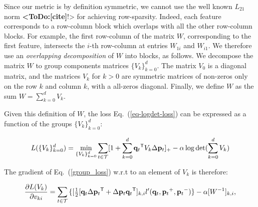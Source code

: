 \documentclass[twoside,11pt]{article}
\newcommand\todo[1]{\textbf{<ToDo:#1}!>}
\newcommand\mat[1]{{#1}}
\renewcommand\vec[1]{\mathbf{#1}}
\newcommand{\T}{{}^\mathsf{T}}
\newcommand{\W}{\mat{W}}
\newcommand{\q}{{\vec{q}}}
\newcommand{\p}{{\vec{p}}}
\newcommand{\trip}{{t}}
\newcommand{\qt}{{\q_{\trip}}}
\newcommand{\pt}{{\p_{\trip}}}
\newcommand{\triplet}{(\qt, \pt^{+}, \pt^{-})}
\newcommand{\Vk}{\mat{V_k}}
\newcommand{\Vz}{\mat{V_0}}
\newcommand{\Vg}{\{\Vk\}_{k=0}^{d}} %
\renewcommand{\eqref}[1]{Eq.~(\ref{#1})}
\begin{document}
Since our metric is by definition symmetric, we cannot use the well known $L_{21}$ norm \todo{[cite]} for achieving row-sparsity. Indeed, each feature corresponds to a row-column block which overlaps with all the other row-column blocks. For example, the first row-column of the matrix $\W$, corresponding to the first feature, intersects the $i$-th row-column at entries $W_{1i}$ and $W_{i1}$. We therefore use an \emph{overlapping decomposition} \citep{jacob2009group,obozinski2011group} of $W$ into blocks, as follows. 
We decompose the matrix $\W$ to group components matrices $\Vg$. The matrix $V_0$ is a diagonal matrix, and the matrices $V_k$ for $k>0$ are symmetric matrices of non-zeros only on the row $k$ and column $k$, with a all-zeros diagonal. Finally, we define $\W$ as the sum $\W = \sum_{k=0}^{d}{\Vk}$.





Given this definition of $\W$, the loss \eqref{eq-logdet-loss} can be expressed as a function of the groups $\Vg$:

\begin{equation}
L(\Vg) = 
  \min_{\Vg} \sum_{\trip \in \cal{T}}  [1+\sum_{k=0}^{d}{\qt\T \Vk\Delta \vec{p}_t } ]_{+} - \alpha \log \det(\sum_{k=0}^{d}{\Vk})
  \label{group_loss}
\end{equation} 

The gradient of \eqref{group_loss} w.r.t to an element of $\mat{V}_k$ is therefore:

\begin{equation}
  \frac{\partial {L (V_k)}}{\partial v_{ki}} = \sum\limits_{t\in \cal{T}}{\{
  [\tfrac{1}{2}[\q_{t}\Delta\p_{t}\T + \Delta\p_{t}\q_{t}\T]_{k,i}  }
  {l'}\triplet\} - \alpha [\W^{-1}]_{k,i},
  \label{grad_group}
\end{equation}
\end{document}
